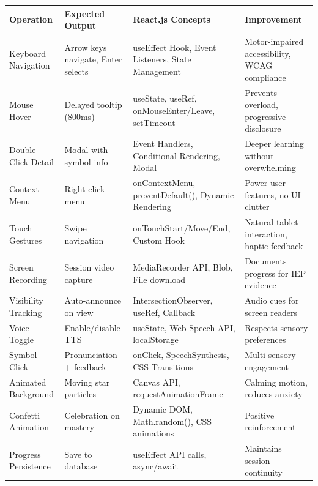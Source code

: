 \documentclass[11pt, a4paper]{article}
\begin{document}
\vspace{0.3cm}
\renewcommand{\arraystretch}{1.4}
\footnotesize
\begin{tabular}{|>{\raggedright}p{2.2cm}|>{\raggedright}p{2.2cm}|>{\raggedright}p{3.2cm}|>{\raggedright\arraybackslash}p{3.8cm}|}
\hline
\textbf{Operation} & \textbf{Expected Output} & \textbf{React.js Concepts} & \textbf{Improvement} \\
\hline
Keyboard Navigation & Arrow keys navigate, Enter selects & useEffect Hook, Event Listeners, State Management & Motor-impaired accessibility, WCAG compliance \\
\hline
Mouse Hover & Delayed tooltip (800ms) & useState, useRef, onMouseEnter/Leave, setTimeout & Prevents overload, progressive disclosure \\
\hline
Double-Click Detail & Modal with symbol info & Event Handlers, Conditional Rendering, Modal & Deeper learning without overwhelming \\
\hline
Context Menu & Right-click menu & onContextMenu, preventDefault(), Dynamic Rendering & Power-user features, no UI clutter \\
\hline
Touch Gestures & Swipe navigation & onTouchStart/Move/End, Custom Hook & Natural tablet interaction, haptic feedback \\
\hline
Screen Recording & Session video capture & MediaRecorder API, Blob, File download & Documents progress for IEP evidence \\
\hline
Visibility Tracking & Auto-announce on view & IntersectionObserver, useRef, Callback & Audio cues for screen readers \\
\hline
Voice Toggle & Enable/disable TTS & useState, Web Speech API, localStorage & Respects sensory preferences \\
\hline
Symbol Click & Pronunciation + feedback & onClick, SpeechSynthesis, CSS Transitions & Multi-sensory engagement \\
\hline
Animated Background & Moving star particles & Canvas API, requestAnimationFrame & Calming motion, reduces anxiety \\
\hline
Confetti Animation & Celebration on mastery & Dynamic DOM, Math.random(), CSS animations & Positive reinforcement \\
\hline
Progress Persistence & Save to database & useEffect API calls, async/await & Maintains session continuity \\
\hline
\end{tabular}
\renewcommand{\arraystretch}{1}
\normalsize
\end{document}
